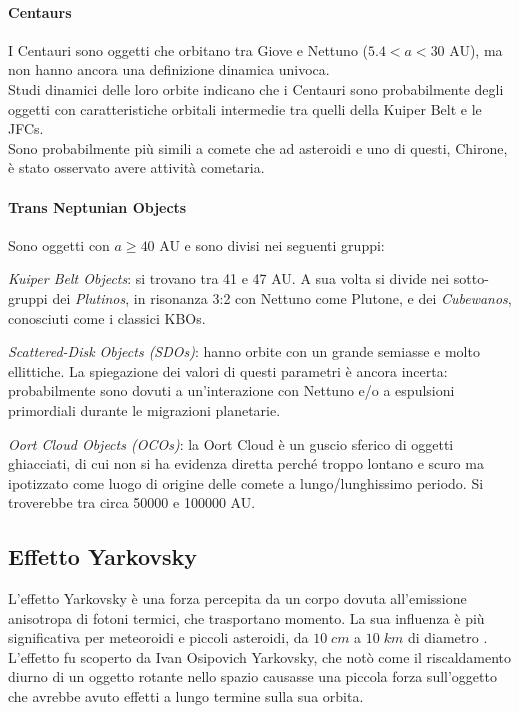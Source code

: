 \documentclass[a4paper,11pt,openright]{book}
\begin{document}
\paragraph*{Centaurs}
I Centauri sono oggetti che orbitano tra Giove e Nettuno ($5.4<a<30$ AU), ma non hanno ancora una definizione dinamica univoca.\\
Studi dinamici delle loro orbite indicano che i Centauri sono probabilmente degli oggetti con caratteristiche orbitali intermedie tra quelli della Kuiper Belt e le JFCs.\\
Sono probabilmente più simili a comete che ad asteroidi e uno di questi, Chirone, è stato osservato avere attività cometaria.

\paragraph*{Trans Neptunian Objects}
Sono oggetti con $a\geq 40$ AU e sono divisi nei seguenti gruppi:

\qquad \textit{Kuiper Belt Objects}: si trovano tra 41 e 47 AU. A sua volta si divide nei sotto-gruppi dei \textit{Plutinos}, in risonanza 3:2 con Nettuno come Plutone, e dei \textit{Cubewanos}, conosciuti come i classici KBOs.

\qquad \textit{Scattered-Disk Objects (SDOs)}: hanno orbite con un grande semiasse e molto ellittiche. La spiegazione dei valori di questi parametri è ancora incerta: probabilmente sono dovuti a un’interazione con Nettuno e/o a espulsioni primordiali durante le migrazioni planetarie.

\qquad \textit{Oort Cloud Objects (OCOs)}: la Oort Cloud è un guscio sferico di oggetti ghiacciati, di cui non si ha evidenza diretta perché troppo lontano e scuro ma ipotizzato come luogo di origine delle comete a lungo/lunghissimo periodo. Si troverebbe tra circa 50000 e 100000 AU.

\subsection{Effetto Yarkovsky}
L’effetto Yarkovsky è una forza percepita da un corpo dovuta all’emissione anisotropa di fotoni termici, che trasportano momento. La sua influenza è più significativa per meteoroidi e piccoli asteroidi, da $10\; cm$ a $10\; km$ di diametro \citep{vokrouhlicky_yarkovsky_2015}.\\
L’effetto fu scoperto da Ivan Osipovich Yarkovsky, che notò come il riscaldamento diurno di un oggetto rotante nello spazio causasse una piccola forza sull’oggetto che avrebbe avuto effetti a lungo termine sulla sua orbita.
\end{document}
